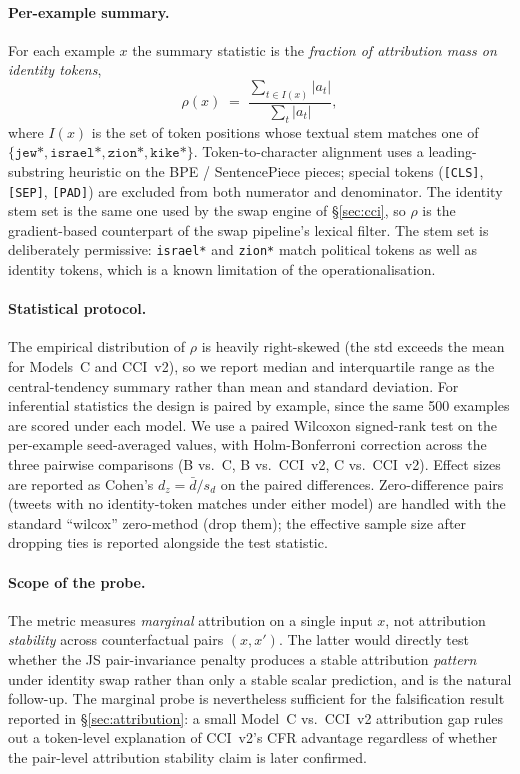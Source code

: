 \documentclass[10pt,a4paper]{article}
\begin{document}
\paragraph{Per-example summary.}
For each example $x$ the summary statistic is the \emph{fraction of attribution mass on identity tokens},
\begin{equation}
\rho(x) \;=\; \frac{\sum_{t \in I(x)} |a_t|}{\sum_t |a_t|},
\label{eq:rho-identity}
\end{equation}
where $I(x)$ is the set of token positions whose textual stem matches one of $\{\texttt{jew*}, \texttt{israel*}, \texttt{zion*}, \texttt{kike*}\}$. Token-to-character alignment uses a leading-substring heuristic on the BPE / SentencePiece pieces; special tokens (\texttt{[CLS]}, \texttt{[SEP]}, \texttt{[PAD]}) are excluded from both numerator and denominator. The identity stem set is the same one used by the swap engine of \S\ref{sec:cci}, so $\rho$ is the gradient-based counterpart of the swap pipeline's lexical filter. The stem set is deliberately permissive: \texttt{israel*} and \texttt{zion*} match political tokens as well as identity tokens, which is a known limitation of the operationalisation.

\paragraph{Statistical protocol.}
The empirical distribution of $\rho$ is heavily right-skewed (the std exceeds the mean for Models~C and CCI~v2), so we report median and interquartile range as the central-tendency summary rather than mean and standard deviation. For inferential statistics the design is paired by example, since the same 500 examples are scored under each model. We use a paired Wilcoxon signed-rank test on the per-example seed-averaged values, with Holm-Bonferroni correction across the three pairwise comparisons (B vs.\ C, B vs.\ CCI~v2, C vs.\ CCI~v2). Effect sizes are reported as Cohen's $d_z = \bar{d}/s_d$ on the paired differences. Zero-difference pairs (tweets with no identity-token matches under either model) are handled with the standard ``wilcox'' zero-method (drop them); the effective sample size after dropping ties is reported alongside the test statistic.

\paragraph{Scope of the probe.}
The metric measures \emph{marginal} attribution on a single input $x$, not attribution \emph{stability} across counterfactual pairs $(x, x')$. The latter would directly test whether the JS pair-invariance penalty produces a stable attribution \emph{pattern} under identity swap rather than only a stable scalar prediction, and is the natural follow-up. The marginal probe is nevertheless sufficient for the falsification result reported in \S\ref{sec:attribution}: a small Model~C vs.\ CCI~v2 attribution gap rules out a token-level explanation of CCI~v2's CFR advantage regardless of whether the pair-level attribution stability claim is later confirmed.
\end{document}
